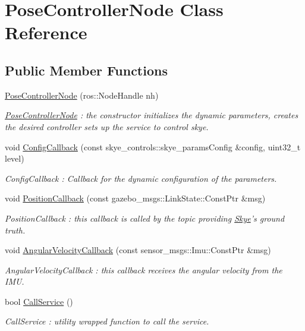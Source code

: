 \hypertarget{class_pose_controller_node}{\section{Pose\-Controller\-Node Class Reference}
\label{class_pose_controller_node}
}
\subsection*{Public Member Functions}
\begin{DoxyCompactItemize}
\item 
\hyperlink{class_pose_controller_node_a17466a8314ad354402401ba27157594c}{Pose\-Controller\-Node} (ros\-::\-Node\-Handle nh)
\begin{DoxyCompactList}\small\item\em \hyperlink{class_pose_controller_node}{Pose\-Controller\-Node} \-: the constructor initializes the dynamic parameters, creates the desired controller sets up the service to control skye. \end{DoxyCompactList}\item 
void \hyperlink{class_pose_controller_node_aab9762d618a38b99cbfbcaecd2163606}{Config\-Callback} (const skye\-\_\-controls\-::skye\-\_\-params\-Config \&config, uint32\-\_\-t level)
\begin{DoxyCompactList}\small\item\em Config\-Callback \-: Callback for the dynamic configuration of the parameters. \end{DoxyCompactList}\item 
void \hyperlink{class_pose_controller_node_ac4582290cf6ff6b5cd9564fd386c3b39}{Position\-Callback} (const gazebo\-\_\-msgs\-::\-Link\-State\-::\-Const\-Ptr \&msg)
\begin{DoxyCompactList}\small\item\em Position\-Callback \-: this callback is called by the topic providing \hyperlink{class_skye}{Skye}'s ground truth. \end{DoxyCompactList}\item 
void \hyperlink{class_pose_controller_node_a1804624b5c2f57b08fcd1c50b8118cd7}{Angular\-Velocity\-Callback} (const sensor\-\_\-msgs\-::\-Imu\-::\-Const\-Ptr \&msg)
\begin{DoxyCompactList}\small\item\em Angular\-Velocity\-Callback \-: this callback receives the angular velocity from the I\-M\-U. \end{DoxyCompactList}\item 
bool \hyperlink{class_pose_controller_node_a0b12265a62dad33caa6063f5cb582c80}{Call\-Service} ()
\begin{DoxyCompactList}\small\item\em Call\-Service \-: utility wrapped function to call the service. \end{DoxyCompactList}\end{DoxyCompactItemize}


